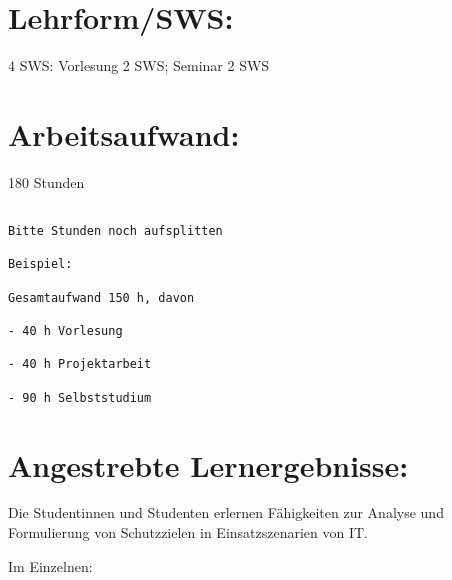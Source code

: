 \section*{Lehrform/SWS:}\label{lehrformsws-19}

4 SWS: Vorlesung 2 SWS; Seminar 2 SWS

\section*{Arbeitsaufwand:}\label{arbeitsaufwand-25}

180 Stunden

\begin{verbatim}

Bitte Stunden noch aufsplitten

Beispiel:

Gesamtaufwand 150 h, davon 

- 40 h Vorlesung 

- 40 h Projektarbeit  

- 90 h Selbststudium 
\end{verbatim}

\section*{Angestrebte
Lernergebnisse:}\label{angestrebte-lernergebnisse-19}

Die Studentinnen und Studenten erlernen Fähigkeiten zur Analyse und
Formulierung von Schutzzielen in Einsatzszenarien von IT.

Im Einzelnen:

